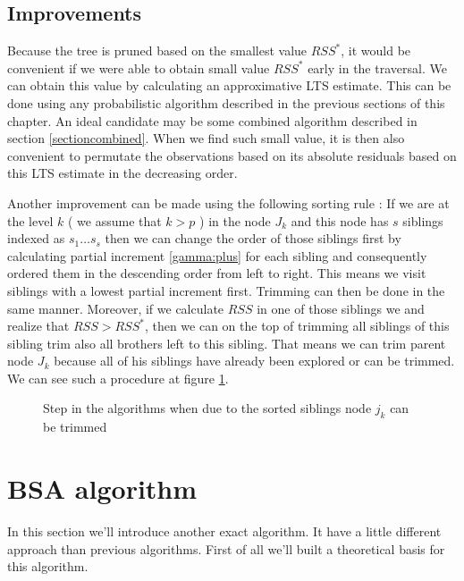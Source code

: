 \subsection{Improvements}
Because the tree is pruned based on the smallest value $RSS^*$, it would be convenient if we were able to obtain small value $RSS^*$ early in the traversal. We can obtain this value by calculating an approximative LTS estimate. This can be done using any probabilistic algorithm described in the previous sections of this chapter. An ideal candidate may be some combined algorithm described in section \ref{sectioncombined}. When we find such small value, it is then also convenient to permutate the observations based on its absolute residuals based on this LTS estimate in the decreasing order.

Another improvement can be made using the following sorting rule : If we are at the level $k$ ( we assume that $k > p$ )
in the node $J_k$ and this node has $s$ siblings indexed as $s_1 \ldots s_s$ then we can change the order of those siblings first by calculating partial increment \eqref{gamma:plus} for each sibling and consequently ordered them in the descending order from left to right. This means we visit siblings with a lowest partial increment first. Trimming can then be done in the same manner. Moreover, if we calculate $RSS$ in one of those siblings we and realize that $RSS > RSS^*$, then we can on the top of trimming all siblings of this sibling trim also all brothers left to this sibling. That means we can trim parent node $J_k$ because all of his siblings have already been explored or can be trimmed. We can see such a procedure at figure \ref{figure:sorting:rule}.

\begin{figure}[h]
\centering
{}
\caption{Step in the algorithms when due to the sorted siblings node $j_k$ can be trimmed}
\label{figure:sorting:rule}
\end{figure}






\section{BSA algorithm}
In this section we'll introduce another exact algorithm. It have a little different approach than previous algorithms. First of all we'll built a theoretical basis for this algorithm.




